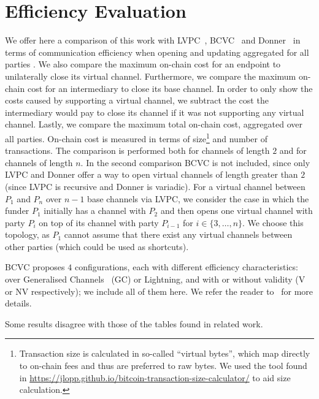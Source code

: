 \section{Efficiency Evaluation}
  \label{section:comparison}
  We offer here a comparison of this work with
  LVPC~\cite{10.1007/978-3-030-65411-5_18}, BCVC~\cite{cryptoeprint:2020:554}
  and Donner~\cite{donner} in terms of communication efficiency when opening and
  updating aggregated for all parties . We also compare
  the maximum on-chain cost for an endpoint to unilaterally close its virtual
  channel. Furthermore, we compare the maximum on-chain cost for an intermediary
  to close its base channel. In order to only show the costs caused by
  supporting a virtual channel, we subtract the cost the intermediary would pay
  to close its channel if it was not supporting any virtual channel. Lastly, we
  compare the maximum total on-chain cost, aggregated over all parties. On-chain
  cost is measured in terms of size\footnote{Transaction size is calculated in
  so-called ``virtual bytes'', which map directly to on-chain fees and thus are
  preferred to raw bytes. We used the tool found in
  \url{https://jlopp.github.io/bitcoin-transaction-size-calculator/} to aid size
  calculation.} and number of transactions. The comparison is performed both for
  channels of length $2$ and for channels of length $n$. In the second
  comparison BCVC is not included, since only LVPC and Donner offer a way to
  open virtual channels of length greater than $2$ (since LVPC is recursive and
  Donner is variadic). For a virtual channel between $P_1$ and $P_n$ over $n-1$
  base channels via LVPC, we consider the case in which the funder $P_1$
  initially has a channel with $P_2$ and then opens one virtual channel with
  party $P_i$ on top of its channel with party $P_{i-1}$ for $i \in \{3, \dots,
  n\}$. We choose this topology, as $P_1$ cannot assume that there exist any
  virtual channels between other parties (which could be used as shortcuts).

  BCVC proposes $4$ configurations, each with different efficiency
  characteristics: over Generalised Channels~\cite{cryptoeprint:2020:476} (GC)
  or Lightning, and with or without validity (V or NV respectively); we include
  all of them here. We refer the reader to~\cite{cryptoeprint:2020:554} for more
  details.

   Some results disagree with those of the
  tables found in related work.

